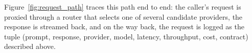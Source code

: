Figure~\ref{fig:request_path} traces this path end to end: the caller's
request is proxied through a router that selects one of several
candidate providers, the response is streamed back, and on the way back,
the request is logged as the tuple (prompt, response, provider, model, latency,
throughput, cost, contract) described above.

% 
% 
% 
% 
% 
% 
% 
% 
